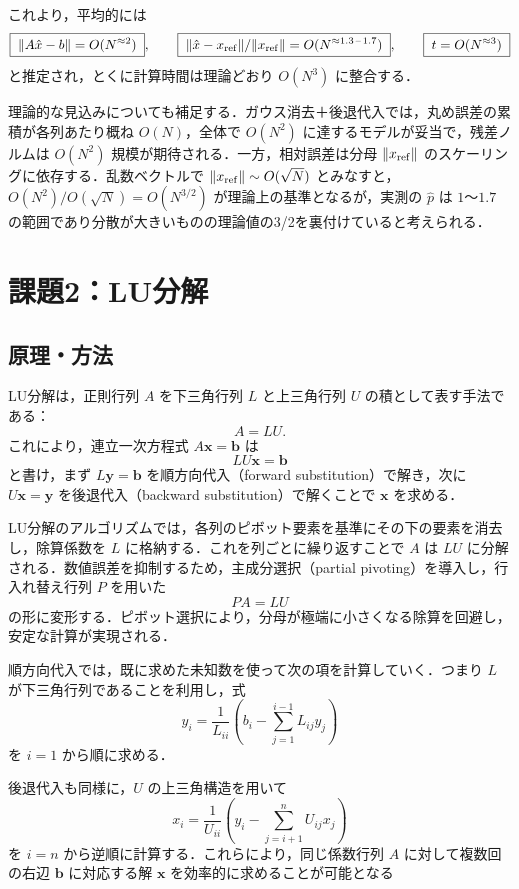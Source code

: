 \documentclass[a4paper,11pt]{ltjsarticle}
\begin{document}
これより，平均的には
\[
\boxed{\;\|A\hat x-b\|=O(N^{\approx 2})\;},\qquad
\boxed{\;\|\hat x-x_{\rm ref}\|/\|x_{\rm ref}\|=O(N^{\approx 1.3\,\text{--}\,1.7})\;},\qquad
\boxed{\;t=O(N^{\approx 3})\;}
\]
と推定され，とくに計算時間は理論どおり $O(N^3)$ に整合する．

理論的な見込みについても補足する．ガウス消去＋後退代入では，丸め誤差の累積が各列あたり概ね $O(N)$，全体で $O(N^2)$ に達するモデルが妥当で，残差ノルムは $O(N^2)$ 規模が期待される．一方，相対誤差は分母 $\|x_{\rm ref}\|$ のスケーリングに依存する．乱数ベクトルで $\|x_{\rm ref}\|\sim O(\sqrt N)$ とみなすと，$O(N^2)/O(\sqrt N)=O(N^{3/2})$ が理論上の基準となるが，実測の $\hat p$ は $1$〜$1.7$ の範囲であり分散が大きいものの理論値の3/2を裏付けていると考えられる．



\section{課題2：LU分解}
\subsection{原理・方法}

LU分解は，正則行列 $A$ を下三角行列 $L$ と上三角行列 $U$ の積として表す手法である：
\[
A = LU.
\]
これにより，連立一次方程式 $A\boldsymbol{x} = \boldsymbol{b}$ は
\[
LU\boldsymbol{x} = \boldsymbol{b}
\]
と書け，まず $L\boldsymbol{y} = \boldsymbol{b}$ を順方向代入（forward substitution）で解き，次に $U\boldsymbol{x} = \boldsymbol{y}$ を後退代入（backward substitution）で解くことで $\boldsymbol{x}$ を求める．

LU分解のアルゴリズムでは，各列のピボット要素を基準にその下の要素を消去し，除算係数を $L$ に格納する．これを列ごとに繰り返すことで $A$ は $LU$ に分解される．数値誤差を抑制するため，主成分選択（partial pivoting）を導入し，行入れ替え行列 $P$ を用いた
\[
P A = L U
\]
の形に変形する．ピボット選択により，分母が極端に小さくなる除算を回避し，安定な計算が実現される．

順方向代入では，既に求めた未知数を使って次の項を計算していく．つまり $L$ が下三角行列であることを利用し，式
\[
y_i = \frac{1}{L_{ii}}\left(b_i - \sum_{j=1}^{i-1} L_{ij}y_j\right)
\]
を $i=1$ から順に求める．

後退代入も同様に，$U$ の上三角構造を用いて
\[
x_i = \frac{1}{U_{ii}}\left(y_i - \sum_{j=i+1}^{n} U_{ij}x_j\right)
\]
を $i=n$ から逆順に計算する．これらにより，同じ係数行列 $A$ に対して複数回の右辺 $\boldsymbol{b}$ に対応する解 $\boldsymbol{x}$ を効率的に求めることが可能となる
\end{document}
